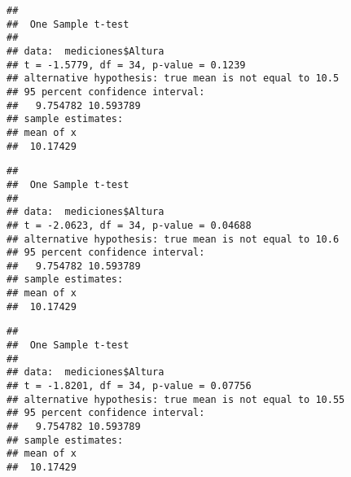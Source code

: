 \documentclass[
]{article}
\newenvironment{Shaded}{\begin{snugshade}}{\end{snugshade}}
\newcommand{\AttributeTok}[1]{\textcolor[rgb]{0.77,0.63,0.00}{#1}}
\newcommand{\CommentTok}[1]{\textcolor[rgb]{0.56,0.35,0.01}{\textit{#1}}}
\newcommand{\FloatTok}[1]{\textcolor[rgb]{0.00,0.00,0.81}{#1}}
\newcommand{\FunctionTok}[1]{\textcolor[rgb]{0.00,0.00,0.00}{#1}}
\newcommand{\NormalTok}[1]{#1}
\newcommand{\SpecialCharTok}[1]{\textcolor[rgb]{0.00,0.00,0.00}{#1}}
\begin{document}
\begin{Shaded}
\end{Shaded}

\begin{verbatim}
## 
##  One Sample t-test
## 
## data:  mediciones$Altura
## t = -1.5779, df = 34, p-value = 0.1239
## alternative hypothesis: true mean is not equal to 10.5
## 95 percent confidence interval:
##   9.754782 10.593789
## sample estimates:
## mean of x 
##  10.17429
\end{verbatim}

\begin{Shaded}
\end{Shaded}

\begin{verbatim}
## 
##  One Sample t-test
## 
## data:  mediciones$Altura
## t = -2.0623, df = 34, p-value = 0.04688
## alternative hypothesis: true mean is not equal to 10.6
## 95 percent confidence interval:
##   9.754782 10.593789
## sample estimates:
## mean of x 
##  10.17429
\end{verbatim}

\begin{Shaded}
\end{Shaded}

\begin{verbatim}
## 
##  One Sample t-test
## 
## data:  mediciones$Altura
## t = -1.8201, df = 34, p-value = 0.07756
## alternative hypothesis: true mean is not equal to 10.55
## 95 percent confidence interval:
##   9.754782 10.593789
## sample estimates:
## mean of x 
##  10.17429
\end{verbatim}
\end{document}
